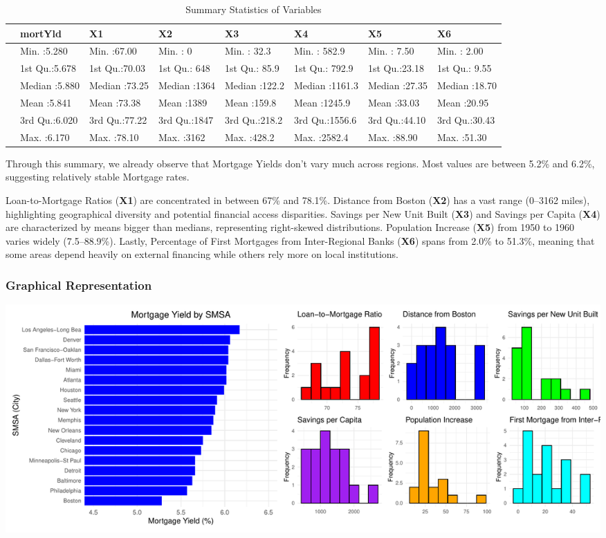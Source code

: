 \documentclass[
  11pt,
]{article}
\begin{document}
\begin{longtable}[t]{llllllll}
\caption{\label{tab:unnamed-chunk-3}Summary Statistics of Variables}\\
\toprule
 & mortYld & X1 & X2 & X3 & X4 & X5 & X6\\
\midrule
 & Min.   :5.280 & Min.   :67.00 & Min.   :   0 & Min.   : 32.3 & Min.   : 582.9 & Min.   : 7.50 & Min.   : 2.00\\
 & 1st Qu.:5.678 & 1st Qu.:70.03 & 1st Qu.: 648 & 1st Qu.: 85.9 & 1st Qu.: 792.9 & 1st Qu.:23.18 & 1st Qu.: 9.55\\
 & Median :5.880 & Median :73.25 & Median :1364 & Median :122.2 & Median :1161.3 & Median :27.35 & Median :18.70\\
 & Mean   :5.841 & Mean   :73.38 & Mean   :1389 & Mean   :159.8 & Mean   :1245.9 & Mean   :33.03 & Mean   :20.95\\
 & 3rd Qu.:6.020 & 3rd Qu.:77.22 & 3rd Qu.:1847 & 3rd Qu.:218.2 & 3rd Qu.:1556.6 & 3rd Qu.:44.10 & 3rd Qu.:30.43\\
\addlinespace
 & Max.   :6.170 & Max.   :78.10 & Max.   :3162 & Max.   :428.2 & Max.   :2582.4 & Max.   :88.90 & Max.   :51.30\\
\bottomrule
\end{longtable}
\endgroup{}

Through this summary, we already observe that Mortgage Yields don't vary
much across regions. Most values are between 5.2\% and 6.2\%, suggesting
relatively stable Mortgage rates.

Loan-to-Mortgage Ratios (\textbf{X1}) are concentrated in between 67\%
and 78.1\%. Distance from Boston (\textbf{X2}) has a vast range (0--3162
miles), highlighting geographical diversity and potential financial
access disparities. Savings per New Unit Built (\textbf{X3}) and Savings
per Capita (\textbf{X4}) are characterized by means bigger than medians,
representing right-skewed distributions. Population Increase
(\textbf{X5}) from 1950 to 1960 varies widely (7.5--88.9\%). Lastly,
Percentage of First Mortgages from Inter-Regional Banks (\textbf{X6})
spans from 2.0\% to 51.3\%, meaning that some areas depend heavily on
external financing while others rely more on local institutions.

\subsubsection{Graphical Representation}\label{graphical-representation}

\includegraphics{Figs/unnamed-chunk-4-1.pdf}
\end{document}
